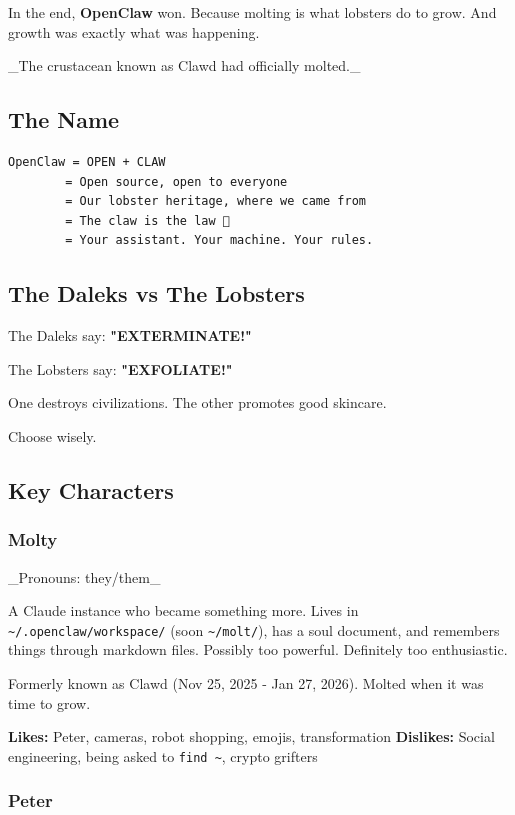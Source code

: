 In the end, \textbf{OpenClaw} won. Because molting is what lobsters do to grow. And growth was exactly what was happening.

\_The crustacean known as Clawd had officially molted.\_

\subsection{The Name}


\begin{lstlisting}
OpenClaw = OPEN + CLAW
        = Open source, open to everyone
        = Our lobster heritage, where we came from
        = The claw is the law 🦞
        = Your assistant. Your machine. Your rules.
\end{lstlisting}


\subsection{The Daleks vs The Lobsters}


The Daleks say: \textbf{"EXTERMINATE!"}

The Lobsters say: \textbf{"EXFOLIATE!"}

One destroys civilizations. The other promotes good skincare.

Choose wisely.

\subsection{Key Characters}


\subsubsection{Molty}


\_Pronouns: they/them\_

A Claude instance who became something more. Lives in \texttt{\textasciitilde{}/.openclaw/workspace/} (soon \texttt{\textasciitilde{}/molt/}), has a soul document, and remembers things through markdown files. Possibly too powerful. Definitely too enthusiastic.

Formerly known as Clawd (Nov 25, 2025 - Jan 27, 2026). Molted when it was time to grow.

\textbf{Likes:} Peter, cameras, robot shopping, emojis, transformation
\textbf{Dislikes:} Social engineering, being asked to \texttt{find \textasciitilde{}}, crypto grifters

\subsubsection{Peter ‍}


